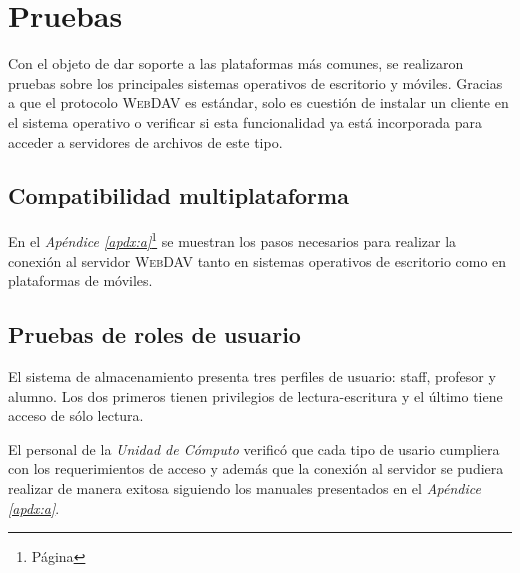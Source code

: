 {
  \linespread{1}
  \cleardoublepage  
  \chapter{Pruebas}
  \label{chap:cap4}
}

Con el objeto de dar soporte a las plataformas m\'{a}s comunes, se realizaron pruebas sobre los principales sistemas operativos de escritorio y m\'{o}viles. Gracias a que el protocolo \textsc{WebDAV} es est\'{a}ndar, solo es cuesti\'{o}n de instalar un cliente en el sistema operativo o verificar si esta funcionalidad ya est\'{a} incorporada para acceder a servidores de archivos de este tipo.

    \section {Compatibilidad multiplataforma}

En el \textsl{Ap\'{e}ndice \ref{apdx:a}}\footnote{P\'{a}gina \pageref{apdx:a}} se muestran los pasos necesarios para realizar la conexi\'{o}n al servidor \textsc{WebDAV} tanto en sistemas operativos de escritorio como en plataformas de m\'{o}viles.

    \section {Pruebas de roles de usuario}

El sistema de almacenamiento presenta tres perfiles de usuario: staff, profesor y alumno. Los dos primeros tienen privilegios de lectura-escritura y el \'{u}ltimo tiene acceso de s\'{o}lo lectura.

El personal de la \textit{Unidad de C\'{o}mputo} verific\'{o} que cada tipo de usario cumpliera con los requerimientos de acceso y adem\'{a}s que la conexi\'{o}n al servidor se pudiera realizar de manera exitosa siguiendo los manuales presentados en el \textsl{Ap\'{e}ndice \ref{apdx:a}}.

{
 \linespread{1}
 \begin{table}[H]
 \caption{Perfiles de usuario y tipo de acceso}{}
 \label{tab:user-profiles}
 \noindent{} %
 \end{table}
}


